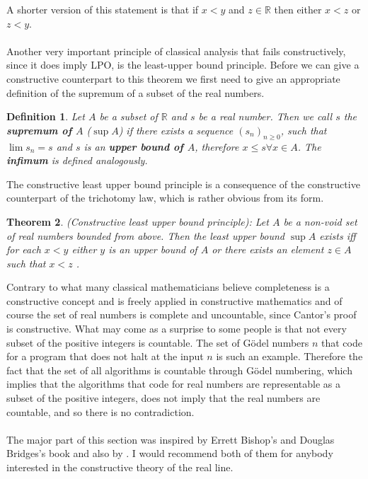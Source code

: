 \documentclass[11pt,a4paper,leqno]{report}
\newtheorem{theorem}{Theorem}[chapter]
\newtheorem{definition}[theorem]{Definition}
\numberwithin{equation}{chapter}
\begin{document}
A shorter version of this statement is that if $x<y$ and $z\in\mathbb{R}$ then either $x<z$ or $z<y$.\\
\\
Another very important principle of classical analysis that fails constructively, since it does imply LPO, is the least-upper bound principle. Before we can give a constructive counterpart to this theorem we first need to give an appropriate definition of the supremum of a subset of the real numbers.
\begin{definition} Let $A$ be a subset of $\mathbb{R}$ and $s$ be a real number. Then we call $s$ the \textbf{supremum of $A$} (\textbf{$\sup A$}) if there exists a sequence $(s_n)_{n\geq 0}$, such that $\lim s_n=s$ and $s$ is an \textbf{upper bound of $A$}, therefore $x\leq s\forall x\in A$. The \textbf{infimum} is defined analogously.\end{definition}
The constructive least upper bound principle is a consequence of the constructive counterpart of the trichotomy law, which is rather obvious from its form.
\begin{theorem}(Constructive least upper bound principle): Let $A$ be a non-void set of real numbers bounded from above. Then the least upper bound $\sup A$ exists iff for each $x<y$ either $y$ is an upper bound of $A$ or there exists an element $z\in A$ such that $x<z$ \cite{CANA}.
\end{theorem}
Contrary to what many classical mathematicians believe completeness is a constructive concept and is freely applied in constructive mathematics and of course the set of real numbers is complete and uncountable, since Cantor's proof is constructive. What may come as a surprise to some people is that not every subset of the positive integers is countable. The set of G\"odel numbers $n$ that code for a program that does not halt at the input $n$ is such an example. Therefore the fact that the set of all algorithms is countable through G\"odel numbering, which implies that the algorithms that code for real numbers are representable as a subset of the positive integers, does not imply that the real numbers are countable, and so there is no contradiction.\\
\\
The major part of this section was inspired by Errett Bishop's and Douglas Bridges's book \cite{CANA} and also by \cite{VAR}. I would recommend both of them for anybody interested in the constructive theory of the real line.
\end{document}
